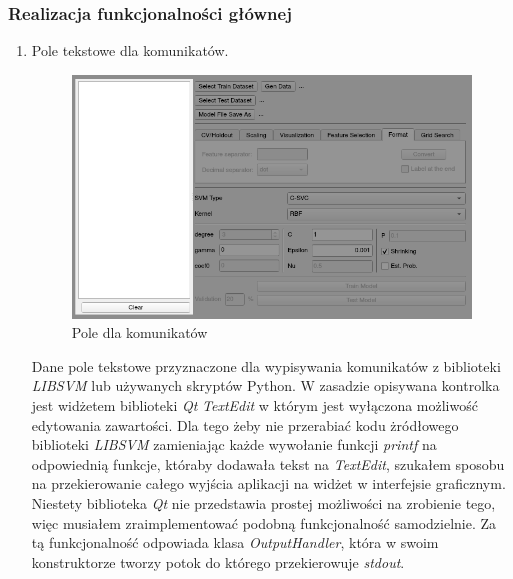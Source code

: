 \documentclass[paper=a4, fontsize=11pt]{scrartcl} %
\numberwithin{equation}{section} %
\numberwithin{figure}{section} %
\begin{document}
\subsubsection{Realizacja funkcjonalności głównej}
    \begin{enumerate}   

    \item Pole tekstowe dla komunikatów.

    \begin{figure}[h]
        \begin{center}
            \includegraphics[scale=0.7]{./img/svm_app_mainw_textedit.png}
            \caption{Pole dla komunikatów}
            \label{fig:text_edit}
        \end{center}
    \end{figure}

    \par Dane pole tekstowe przyznaczone dla wypisywania komunikatów z biblioteki
    \textit{LIBSVM} lub używanych skryptów Python. W zasadzie opisywana kontrolka jest
    widżetem biblioteki \textit{Qt} \textit{TextEdit} w którym jest wyłączona możliwość
    edytowania zawartości. Dla tego żeby nie przerabiać kodu żródłowego biblioteki
    \textit{LIBSVM} zamieniając każde wywołanie funkcji \textit{printf} na odpowiednią funkcje,
    któraby dodawała tekst na \textit{TextEdit}, szukałem sposobu na przekierowanie całego
    wyjścia aplikacji na widżet w interfejsie graficznym. Niestety biblioteka \textit{Qt} nie
    przedstawia prostej możliwości na zrobienie tego, więc musiałem zraimplementować podobną
    funkcjonalność samodzielnie. Za tą funkcjonalność odpowiada klasa \textit{OutputHandler},
    która w swoim konstruktorze tworzy potok do którego przekierowuje \textit{stdout}.


\end{enumerate}
\end{document}
